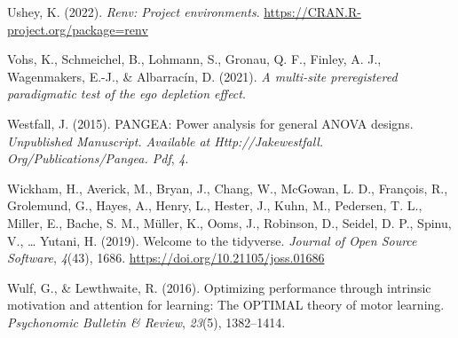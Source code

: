 \documentclass[
  man, donotrepeattitle,mask,floatsintext]{apa7}
\newlength{\cslhangindent}
\newlength{\cslentryspacingunit} %
\newenvironment{CSLReferences}[2] %
 {%
  \setlength{\parindent}{0pt}
  \ifodd #1
  \let\oldpar\par
  \def\par{\hangindent=\cslhangindent\oldpar}
  \fi
  \setlength{\parskip}{#2\cslentryspacingunit}
 }%
 {}
\begin{document}
\begin{CSLReferences}{1}{0}
\leavevmode{}%
Ushey, K. (2022). \emph{Renv: Project environments}. \url{https://CRAN.R-project.org/package=renv}

\leavevmode{}%
Vohs, K., Schmeichel, B., Lohmann, S., Gronau, Q. F., Finley, A. J., Wagenmakers, E.-J., \& Albarracín, D. (2021). \emph{A multi-site preregistered paradigmatic test of the ego depletion effect}.

\leavevmode{}%
Westfall, J. (2015). PANGEA: Power analysis for general ANOVA designs. \emph{Unpublished Manuscript. Available at Http://Jakewestfall. Org/Publications/Pangea. Pdf}, \emph{4}.

\leavevmode{}%
Wickham, H., Averick, M., Bryan, J., Chang, W., McGowan, L. D., François, R., Grolemund, G., Hayes, A., Henry, L., Hester, J., Kuhn, M., Pedersen, T. L., Miller, E., Bache, S. M., Müller, K., Ooms, J., Robinson, D., Seidel, D. P., Spinu, V., \ldots{} Yutani, H. (2019). Welcome to the {tidyverse}. \emph{Journal of Open Source Software}, \emph{4}(43), 1686. \url{https://doi.org/10.21105/joss.01686}

\leavevmode{}%
Wulf, G., \& Lewthwaite, R. (2016). Optimizing performance through intrinsic motivation and attention for learning: The OPTIMAL theory of motor learning. \emph{Psychonomic Bulletin \& Review}, \emph{23}(5), 1382--1414.

\end{CSLReferences}
\end{document}
